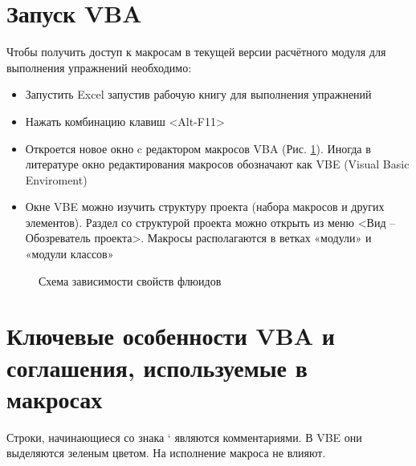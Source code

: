 \documentclass[]{scrreprt}
\begin{document}
\section{Запуск VBA}

Чтобы получить доступ к макросам в текущей версии расчётного модуля для выполнения упражнений необходимо:
\begin{itemize}
	\item Запустить Excel запустив рабочую книгу для выполнения упражнений
	\item Нажать комбинацию клавиш <Alt-F11>
	\item Откроется новое окно c редактором макросов VBA (Рис. \ref{ris:VBA_overview}). Иногда в литературе окно редактирования макросов обозначают как VBE (Visual Basic Enviroment)
	\item Окне VBE можно изучить структуру проекта (набора макросов и других элементов). Раздел со структурой проекта можно открыть из меню <Вид – Обозреватель проекта>. Макросы располагаются в ветках «модули» и «модули классов»
	 
\end{itemize}

\begin{figure}[h]
	\caption{Схема зависимости свойств флюидов}
	\label{ris:VBA_overview}
\end{figure}

\section{Ключевые особенности VBA и соглашения, используемые в макросах}
Строки, начинающиеся со знака ‘ являются комментариями. В VBE они выделяются зеленым цветом. На исполнение макроса не влияют.
\end{document}
